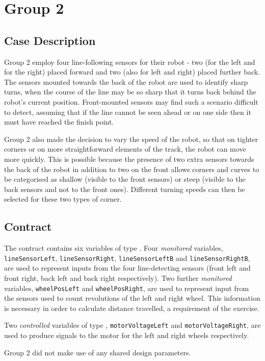\section{Group 2}
\subsection{Case Description}
Group 2 employ four line-following sensors for their robot - two (for
the left and for the right) placed forward and two (also for left and
right) placed further back.  The sensors mounted towards the back of
the robot are used to identify sharp turns, when the course of the
line may be so sharp that it turns back behind the robot's current
position.  Front-mounted sensors may find such a scenario difficult to
detect, assuming that if the line cannot be seen ahead or on one side
then it must have reached the finish point.

Group 2 also made the decision to vary the speed of the robot, so that
on tighter corners or on more straightforward elements of the track,
the robot can move more quickly.  This is possible because the
presence of two extra sensors towards the back of the robot in
addition to two on the front allows corners and curves to be
categorised as shallow (visible to the front sensors) or steep
(visible to the back sensors and not to the front ones).  Different
turning speeds can then be selected for these two types of corner.

\subsection{Contract}
The contract contains six variables of type . Four
\emph{monitored} variables, \texttt{lineSensorLeft},
\texttt{lineSensorRight}, \texttt{lineSensorLeftB} and
\texttt{lineSensorRightB}, are used to represent inputs from the four
line-detecting sensors (front left and front right, back left and back
right respectively).  Two further \emph{monitored} variables,
\texttt{wheelPosLeft} and \texttt{wheelPosRight}, are used to
represent input from the sensors used to count revolutions of the left
and right wheel.  This information is necessary in order to calculate
distance travelled, a requirement of the exercise.

Two \emph{controlled} variables of type ,
\texttt{motorVoltageLeft} and \texttt{motorVoltageRight}, are used to
produce signals to the motor for the left and right wheels
respectively.

Group 2 did not make use of any shared design parameters.

